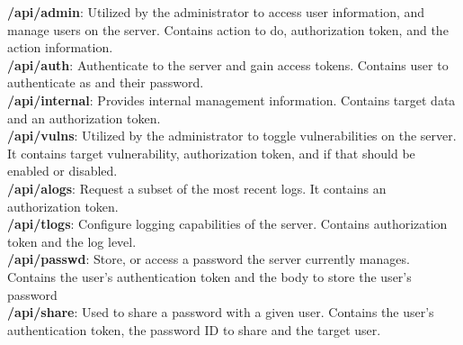 \textbf{/api/admin}: Utilized by the administrator to access user information, and manage users on the server. Contains action to do, authorization token, and the action information.\\
\textbf{/api/auth}: Authenticate to the server and gain access tokens. Contains user to authenticate as and their password.\\
\textbf{/api/internal}: Provides internal management information. Contains target data and an authorization token.\\
\textbf{/api/vulns}: Utilized by the administrator to toggle vulnerabilities on the server. It contains target vulnerability, authorization token, and if that should be enabled or disabled.\\
\textbf{/api/alogs}: Request a subset of the most recent logs. It contains an authorization token.\\
\textbf{/api/tlogs}: Configure logging capabilities of the server. Contains authorization token and the log level.\\
\textbf{/api/passwd}: Store, or access a password the server currently manages. Contains the user's authentication token and the body to store the user's password\\
\textbf{/api/share}: Used to share a password with a given user. Contains the user's authentication token, the password ID to share and the target user.